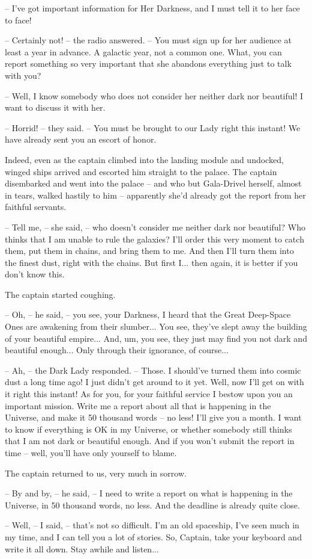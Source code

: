 \documentclass[ebook,oneside,final,openright]{memoir}
\begin{document}
– I’ve got important information for Her Darkness, and I must tell it to her face to face!\par
– Certainly not! – the radio answered. – You must sign up for her audience at least a year in advance. A galactic year, not a common one. What, you can report something so very important that she abandons everything just to talk with you?\par
– Well, I know somebody who does not consider her neither dark nor beautiful! I want to discuss it with her.\par
– Horrid! – they said. – You must be brought to our Lady right this instant! We have already sent you an escort of honor.\par
\par
Indeed, even as the captain climbed into the landing module and undocked, winged ships arrived and escorted him straight to the palace. The captain disembarked and went into the palace – and who but Gala-Drivel herself, almost in tears, walked hastily to him – apparently she’d already got the report from her faithful servants.\par
– Tell me, – she said, – who doesn’t consider me neither dark nor beautiful? Who thinks that I am unable to rule the galaxies? I’ll order this very moment to catch them, put them in chains, and bring them to me. And then I’ll turn them into the finest dust, right with the chains. But first I... then again, it is better if you don’t know this.\par
The captain started coughing.\par
– Oh, – he said, – you see, your Darkness, I heard that the Great Deep-Space Ones are awakening from their slumber... You see, they’ve slept away the building of your beautiful empire... And, um, you see, they just may find you not dark and beautiful enough... Only through their ignorance, of course...\par
– Ah, – the Dark Lady responded. – Those. I should’ve turned them into cosmic dust a long time ago! I just didn’t get around to it yet. Well, now I’ll get on with it right this instant! As for you, for your faithful service I bestow upon you an important mission. Write me a report about all that is happening in the Universe, and make it 50 thousand words – no less! I’ll give you a month. I want to know if everything is OK in my Universe, or whether somebody still thinks that I am not dark or beautiful enough. And if you won’t submit the report in time – well, you’ll have only yourself to blame.\par
\par
The captain returned to us, very much in sorrow.\par
– By and by, – he said, – I need to write a report on what is happening in the Universe, in 50 thousand words, no less. And the deadline is already quite close.\par
– Well, – I said, – that’s not so difficult. I’m an old spaceship, I’ve seen much in my time, and I can tell you a lot of stories. So, Captain, take your keyboard and write it all down. Stay awhile and listen...
\end{document}
